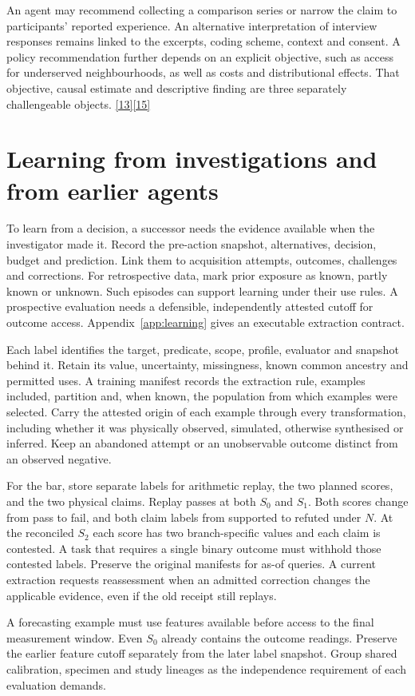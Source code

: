 \documentclass[11pt,a4paper]{article}
\newcommand{\partpage}[1]{\clearpage\section{#1}}
\newcommand{\topic}[1]{\par\smallskip{\sffamily\bfseries\color{ink}#1\par}\nobreak}
\newcommand{\src}[1]{\hyperlink{ref#1}{[#1]}}
\begin{document}
An agent may recommend collecting a comparison series or narrow the claim to participants' reported experience. An alternative interpretation of interview responses remains linked to the excerpts, coding scheme, context and consent. A policy recommendation further depends on an explicit objective, such as access for underserved neighbourhoods, as well as costs and distributional effects. That objective, causal estimate and descriptive finding are three separately challengeable objects. \src{13}\src{15}

\partpage{Learning from investigations and from earlier agents}
To learn from a decision, a successor needs the evidence available when the investigator made it. Record the pre-action snapshot, alternatives, decision, budget and prediction. Link them to acquisition attempts, outcomes, challenges and corrections. For retrospective data, mark prior exposure as known, partly known or unknown. Such episodes can support learning under their use rules. A prospective evaluation needs a defensible, independently attested cutoff for outcome access. Appendix~\ref{app:learning} gives an executable extraction contract.

\topic{Labels have targets and expiry conditions}
Each label identifies the target, predicate, scope, profile, evaluator and snapshot behind it. Retain its value, uncertainty, missingness, known common ancestry and permitted uses. A training manifest records the extraction rule, examples included, partition and, when known, the population from which examples were selected. Carry the attested origin of each example through every transformation, including whether it was physically observed, simulated, otherwise synthesised or inferred. Keep an abandoned attempt or an unobservable outcome distinct from an observed negative.

For the bar, store separate labels for arithmetic replay, the two planned scores, and the two physical claims. Replay passes at both $S_0$ and $S_1$. Both scores change from pass to fail, and both claim labels from supported to refuted under $N$. At the reconciled $S_2$ each score has two branch-specific values and each claim is contested. A task that requires a single binary outcome must withhold those contested labels. Preserve the original manifests for as-of queries. A current extraction requests reassessment when an admitted correction changes the applicable evidence, even if the old receipt still replays.

A forecasting example must use features available before access to the final measurement window. Even $S_0$ already contains the outcome readings. Preserve the earlier feature cutoff separately from the later label snapshot. Group shared calibration, specimen and study lineages as the independence requirement of each evaluation demands.
\end{document}
